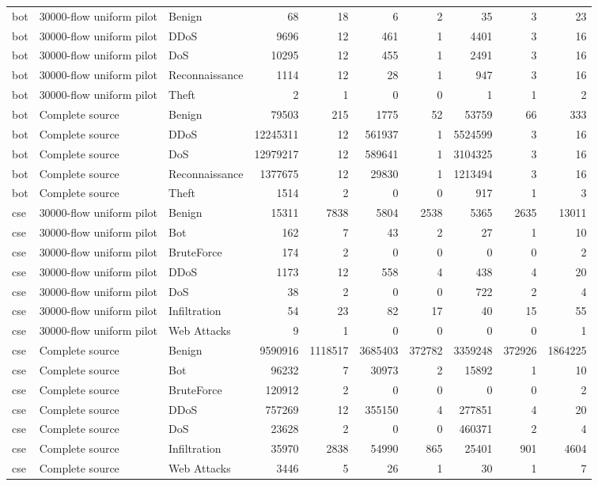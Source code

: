 \begin{tabular}{lllrrrrrrr}
bot & 30000-flow uniform pilot & Benign & 68 & 18 & 6 & 2 & 35 & 3 & 23 \\
bot & 30000-flow uniform pilot & DDoS & 9696 & 12 & 461 & 1 & 4401 & 3 & 16 \\
bot & 30000-flow uniform pilot & DoS & 10295 & 12 & 455 & 1 & 2491 & 3 & 16 \\
bot & 30000-flow uniform pilot & Reconnaissance & 1114 & 12 & 28 & 1 & 947 & 3 & 16 \\
bot & 30000-flow uniform pilot & Theft & 2 & 1 & 0 & 0 & 1 & 1 & 2 \\
bot & Complete source & Benign & 79503 & 215 & 1775 & 52 & 53759 & 66 & 333 \\
bot & Complete source & DDoS & 12245311 & 12 & 561937 & 1 & 5524599 & 3 & 16 \\
bot & Complete source & DoS & 12979217 & 12 & 589641 & 1 & 3104325 & 3 & 16 \\
bot & Complete source & Reconnaissance & 1377675 & 12 & 29830 & 1 & 1213494 & 3 & 16 \\
bot & Complete source & Theft & 1514 & 2 & 0 & 0 & 917 & 1 & 3 \\
cse & 30000-flow uniform pilot & Benign & 15311 & 7838 & 5804 & 2538 & 5365 & 2635 & 13011 \\
cse & 30000-flow uniform pilot & Bot & 162 & 7 & 43 & 2 & 27 & 1 & 10 \\
cse & 30000-flow uniform pilot & BruteForce & 174 & 2 & 0 & 0 & 0 & 0 & 2 \\
cse & 30000-flow uniform pilot & DDoS & 1173 & 12 & 558 & 4 & 438 & 4 & 20 \\
cse & 30000-flow uniform pilot & DoS & 38 & 2 & 0 & 0 & 722 & 2 & 4 \\
cse & 30000-flow uniform pilot & Infiltration & 54 & 23 & 82 & 17 & 40 & 15 & 55 \\
cse & 30000-flow uniform pilot & Web Attacks & 9 & 1 & 0 & 0 & 0 & 0 & 1 \\
cse & Complete source & Benign & 9590916 & 1118517 & 3685403 & 372782 & 3359248 & 372926 & 1864225 \\
cse & Complete source & Bot & 96232 & 7 & 30973 & 2 & 15892 & 1 & 10 \\
cse & Complete source & BruteForce & 120912 & 2 & 0 & 0 & 0 & 0 & 2 \\
cse & Complete source & DDoS & 757269 & 12 & 355150 & 4 & 277851 & 4 & 20 \\
cse & Complete source & DoS & 23628 & 2 & 0 & 0 & 460371 & 2 & 4 \\
cse & Complete source & Infiltration & 35970 & 2838 & 54990 & 865 & 25401 & 901 & 4604 \\
cse & Complete source & Web Attacks & 3446 & 5 & 26 & 1 & 30 & 1 & 7 \\
\bottomrule
\end{tabular}

